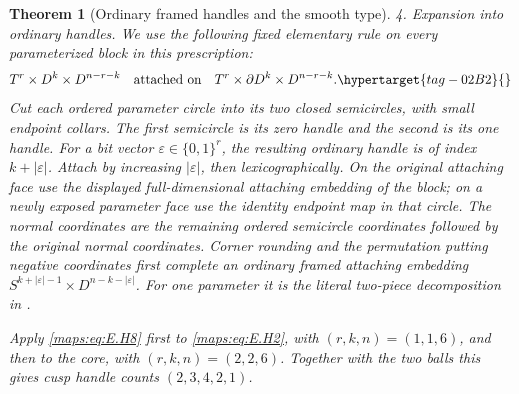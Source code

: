 \documentclass[11pt,a4paper]{article}
\numberwithin{equation}{section}
\newtheorem{theorem}{Theorem}[section]
\theoremstyle{definition}
\begin{document}
\begin{theorem}[Ordinary framed handles and the smooth type]
\emph{4. Expansion into ordinary handles.}
We use the following fixed elementary rule on every parameterized
block in this prescription:
\begin{equation}
 T^r\times D^k\times D^{n-r-k}
 \quad\hbox{attached on}\quad
 T^r\times\partial D^k\times D^{n-r-k}.
 \hypertarget{tag-02B2}{}\label{maps:eq:E.H8}
\end{equation}
Cut each ordered parameter circle into its two closed semicircles,
with small endpoint collars.  The first semicircle is its zero
handle and the second is its one handle.  For a bit vector
$\varepsilon\in\{0,1\}^r$, the resulting ordinary handle is of
index $k+|\varepsilon|$.  Attach by increasing $|\varepsilon|$,
then lexicographically.  On the original attaching face use
the displayed full-dimensional attaching embedding of the block;
on a newly exposed parameter face use the identity endpoint map
in that circle.  The normal coordinates are the remaining ordered
semicircle coordinates followed by the original normal coordinates.
Corner rounding and the permutation putting negative coordinates
first complete an ordinary framed attaching embedding
$S^{k+|\varepsilon|-1}\times D^{n-k-|\varepsilon|}$.
  For one parameter
it is the literal two-piece decomposition in
\cite[Section~4.1, equation~(16), p.~103]{mapsVogel09}.


Apply \eqref{maps:eq:E.H8} first to \eqref{maps:eq:E.H2}, with $(r,k,n)=(1,1,6)$, and then
to the core, with $(r,k,n)=(2,2,6)$.  Together with the two balls
this gives cusp handle counts $(2,3,4,2,1)$.


\end{theorem}
\end{document}
